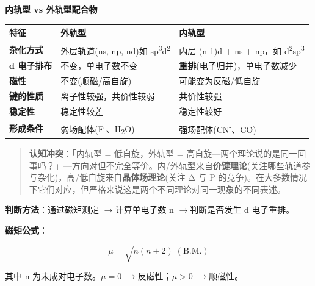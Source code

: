 \documentclass[a4paper,11pt]{ctexart}
\newcounter{none}
\newcommand{\箭}{\ensuremath{\rightarrow}}
\newcommand{\左箭}{\ensuremath{\leftarrow}}
\newcommand{\上箭}{\ensuremath{\uparrow}}
\newcommand{\下箭}{\ensuremath{\downarrow}}
\newcommand{\衡}{\ensuremath{\rightleftharpoons}}
\newcommand{\双箭}{\ensuremath{\leftrightarrow}}
\newcommand{\约等于}{\ensuremath{\approx}}
\newcommand{\小于等于}{\ensuremath{\leq}}
\newcommand{\大于等于}{\ensuremath{\geq}}
\newcommand{\不等于}{\ensuremath{\neq}}
\newcommand{\西格马}{\ensuremath{\sigma}}
\newcommand{\派}{\ensuremath{\pi}}
\begin{document}
\textbf{内轨型 vs 外轨型配合物}

{\def\LTcaptype{none} %
\begin{longtable}[]{@{}
  >{\raggedright\arraybackslash}p{}
  >{\raggedright\arraybackslash}p{}
  >{\raggedright\arraybackslash}p{}@{}}
\toprule\noalign{}
\begin{minipage}[b]{\linewidth}\raggedright
特征
\end{minipage} & \begin{minipage}[b]{\linewidth}\raggedright
外轨型
\end{minipage} & \begin{minipage}[b]{\linewidth}\raggedright
内轨型
\end{minipage} \\
\midrule\noalign{}
\endhead
\bottomrule\noalign{}
\endlastfoot
\textbf{杂化方式} & 外层轨道(ns, np, nd)如 sp\textsuperscript{3}d\textsuperscript{2} & 内层 (n-1)d + ns + np，如 d\textsuperscript{2}sp\textsuperscript{3} \\
\textbf{d 电子排布} & 不变，单电子数不变 & \textbf{重排}(电子归并)，单电子数减少 \\
\textbf{磁性} & 不变(顺磁/高自旋) & 可能变为反磁/低自旋 \\
\textbf{键的性质} & 离子性较强，共价性较弱 & 共价性较强 \\
\textbf{稳定性} & 稳定性较差 & 稳定性较好 \\
\textbf{形成条件} & 弱场配体(F\textsuperscript{-}、H\textsubscript{2}O) & 强场配体(CN\textsuperscript{-}、CO) \\
\end{longtable}
}

\begin{quote}
\textbf{认知冲突}：「内轨型 = 低自旋，外轨型 = 高自旋---两个理论说的是同一回事吗？」---方向对但不完全等价。内/外轨型来自\textbf{价键理论}(关注哪些轨道参与杂化)，高/低自旋来自\textbf{晶体场理论}(关注 Δ 与 P 的竞争)。在大多数情况下它们对应，但严格来说这是两个不同理论对同一现象的不同表述。
\end{quote}

\textbf{判断方法}：通过磁矩测定 \箭 计算单电子数 n \箭 判断是否发生 d 电子重排。

\textbf{磁矩公式}：

\[
\mu = \sqrt{n(n+2)}\ (\text{B.M.})
\]

其中 n 为未成对电子数。\(\mu = 0\) \箭 反磁性；\(\mu > 0\) \箭 顺磁性。
\end{document}
